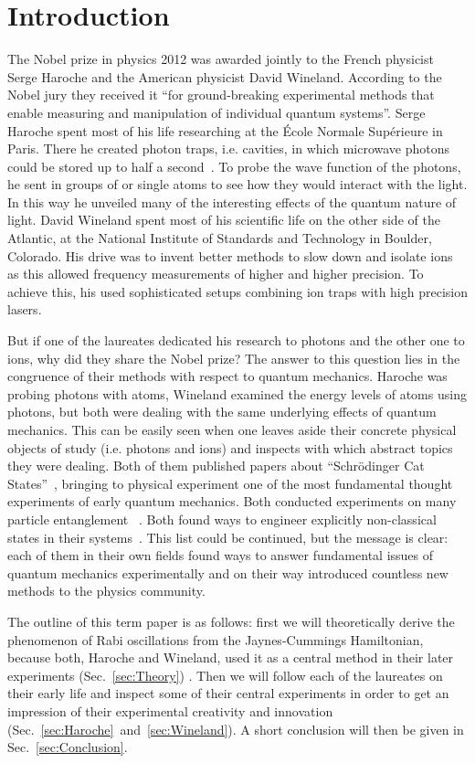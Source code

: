 \section{Introduction}
The Nobel prize in physics 2012 was awarded jointly to the French physicist
Serge Haroche and the American physicist David Wineland.
According to the Nobel jury they received it ``for ground-breaking experimental
methods that enable measuring and manipulation of individual quantum systems''.
Serge Haroche spent most of his life researching at the École Normale Supérieure
in Paris. There he created photon traps, i.e. cavities, in which microwave
photons could be stored up to half a second~\cite{haroche2007QuantumJumps}. To
probe the wave function of the photons, he sent in groups of or single atoms to
see how they would interact with the light. In this way he unveiled many of the
interesting effects of the quantum nature of light. David Wineland spent most of
his scientific life on the other side of the Atlantic, at the National Institute
of Standards and Technology in Boulder, Colorado. His drive was to invent better
methods to slow down and
isolate ions as this allowed frequency measurements of
higher and higher precision. To achieve this, his used sophisticated setups
combining ion traps with high precision lasers. 

But if one of the laureates dedicated his research to photons and the other one
to ions, why did they share the Nobel prize? The answer to this question lies in
the congruence of their methods with respect to quantum mechanics. Haroche was
probing photons with atoms, Wineland examined the energy levels of atoms using
photons, but both were dealing with the same underlying effects of quantum
mechanics. This can be easily seen when one leaves aside their concrete physical
objects of study (i.e. photons and ions) and inspects with which abstract topics
they were dealing. Both of them published papers about ``Schrödinger Cat
States''~\cite{brune1992manipulation, monroe1996schrodinger}, bringing to
physical experiment one of the most fundamental thought experiments of early
quantum mechanics. Both conducted experiments on many particle entanglement
~\cite{rauschenbeutel2000step, sackett2000experimental}. Both found ways to
engineer explicitly  non-classical states in their systems~\cite{meekhof1996generation,
deleglise2008reconstruction}. This list could be continued, but the message is
clear: each of them in their own fields found ways to answer fundamental issues
of quantum mechanics experimentally and on their way introduced countless new
methods to the physics community.

The outline of this term paper is as follows: first we will theoretically derive
the phenomenon of Rabi oscillations from the Jaynes-Cummings Hamiltonian, because
both, Haroche and Wineland, used it as a central method in their later
experiments (Sec.~\ref{sec:Theory}) . Then we will follow each of the laureates
on their early life and inspect some of their central experiments in order to
get an impression of their experimental creativity and innovation
(Sec.~\ref{sec:Haroche}~and~\ref{sec:Wineland}). A short conclusion will then be
given in Sec.~\ref{sec:Conclusion}.
